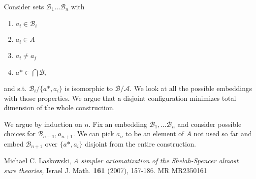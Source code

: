 \documentclass{amsart}
\newcommand{\A}{\mathcal A}
\newcommand{\B}{\mathcal B}
\begin{document}
Consider sets $\B_1 \ldots \B_n$ with 
\begin{enumerate}
	\item $a_i \in \B_i$
	\item $a_i \in A$
	\item $a_i \neq a_j$
	\item $a* \in \bigcap \B_i$
\end{enumerate}
 and  s.t. $\B_i / \{a*, a_i\}$ is isomorphic to $\B/\A$. We look at all the possible embeddings with those properties. We argue that a disjoint configuration minimizes total dimension of the whole construction.

We argue by induction on $n$. Fix an embedding $\B_1, \ldots \B_n$ and consider possible choices for $\B_{n+1}, a_{n+1}$. We can pick $a_n$ to be an element of $A$ not used so far and embed $\B_{n+1}$ over $\{a*, a_i\}$ disjoint from the entire construction.

\begin{thebibliography}{9}

	Michael C. Laskowski, \textsl{A simpler axiomatization of the Shelah-Spencer almost sure theories,}
	Israel J. Math. \textbf{161} (2007), 157-186. MR MR2350161

\end{thebibliography}
\end{document}
